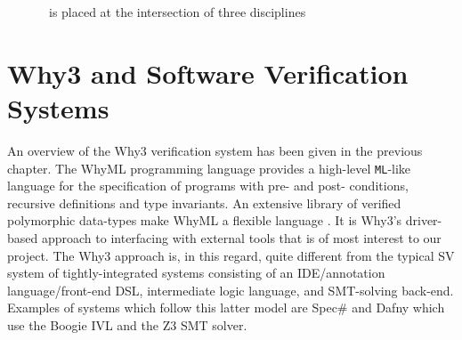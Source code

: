 \begin{figure}

\centering
\def\firstcircle{(3cm,0cm) circle (2.5cm)}
\def\secondcircle{(0cm,0cm) circle (2.5cm)}
\def\thirdcircle{(1.5cm,3cm) circle (2.5cm)}

\caption{\where~is placed at the intersection of three disciplines}
\label{fig:litreview}

\end{figure}


\section{\textsf{Why3} and Software Verification Systems}
\label{sec:lrsv}

\sloppypar
An overview of the \textsf{Why3} verification system \cite{why:shephard,why:whereprovers} has been given in the previous chapter. The WhyML programming language provides a high-level \texttt{ML}-like language for the specification of programs with pre- and post- conditions, recursive definitions and type invariants. An extensive library of verified polymorphic data-types make WhyML a flexible language \cite{verifythis,why:polymorphic}. 
It is \textsf{Why3}'s driver-based approach to interfacing with external tools that is of most interest to our project. 
The \textsf{Why3} approach is, in this regard, quite different from the typical SV system of tightly-integrated systems consisting of an IDE/annotation language/front-end DSL, intermediate logic language, and SMT-solving back-end. 
Examples of systems which follow this latter model are Spec\# \cite{spec} and Dafny \cite{Dafny} which use the Boogie \cite{Boogie} IVL and the Z3 \cite{Z3} SMT solver.

